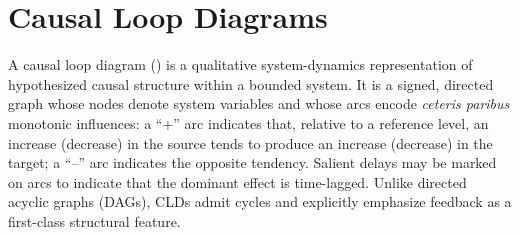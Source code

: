 










\section*{Causal Loop Diagrams}

A causal loop diagram (\CLD) is a qualitative system-dynamics representation of hypothesized causal structure within a bounded system. It is a signed, directed graph whose nodes denote system variables and whose arcs encode \emph{ceteris paribus} monotonic influences: a \enquote{+} arc indicates that, relative to a reference level, an increase (decrease) in the source tends to produce an increase (decrease) in the target; a \enquote{--} arc indicates the opposite tendency. Salient delays may be marked on arcs to indicate that the dominant effect is time-lagged. Unlike directed acyclic graphs (DAGs), CLDs admit cycles and explicitly emphasize feedback as a first-class structural feature.

